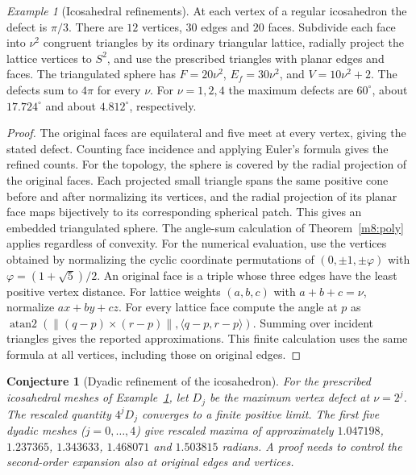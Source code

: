 \documentclass[11pt,reqno]{amsart}
\newtheorem{conjecture}[theorem]{Conjecture}
\theoremstyle{definition}
\theoremstyle{remark}
\newtheorem{example}[theorem]{Example}
\numberwithin{equation}{section}
\begin{document}
\begin{example}[Icosahedral refinements]\label{m8:icosa}
At each vertex of a regular icosahedron the defect is $\pi/3$.
There are $12$ vertices, $30$ edges and $20$ faces. Subdivide each face into $\nu^2$ congruent
triangles by its ordinary triangular lattice, radially project
the lattice vertices to $S^2$, and use the prescribed triangles
with planar edges and faces. The triangulated sphere has
$F=20\nu^2$, $E_f=30\nu^2$, and $V=10\nu^2+2$.
The defects sum to $4\pi$ for every $\nu$. For $\nu=1,2,4$
the maximum defects are $60^\circ$, about $17.724^\circ$ and
about $4.812^\circ$, respectively.
\end{example}
\begin{proof}
The original faces are equilateral and five meet at every vertex,
giving the stated defect. Counting face incidence and applying
Euler's formula gives the refined counts. For the topology, the
sphere is covered by the radial projection of the original
faces. Each projected small triangle spans the same positive cone
before and after normalizing its vertices, and the radial
projection of its planar face maps bijectively to its corresponding
spherical patch. This gives an embedded triangulated sphere.
The angle-sum calculation of Theorem~\ref{m8:poly} applies
regardless of convexity. For the numerical evaluation,
use the vertices obtained by normalizing the cyclic coordinate
permutations of $(0,\pm1,\pm\varphi)$ with
$\varphi=(1+\sqrt5)/2$. An original face is a triple whose three
edges have the least positive vertex distance. For lattice
weights $(a,b,c)$ with $a+b+c=\nu$, normalize $a x+b y+c z$.
For every lattice face compute the angle at $p$ as
$\operatorname{atan2}(\|(q-p)\times(r-p)\|,
\langle q-p,r-p\rangle)$. Summing over incident triangles gives
the reported approximations. This finite calculation uses the same
formula at all vertices, including those on original edges.
\end{proof}

\begin{conjecture}[Dyadic refinement of the icosahedron]\label{m8:conjecture}
For the prescribed icosahedral meshes of Example~\ref{m8:icosa},
let $D_j$ be the maximum vertex defect at $\nu=2^j$.
The rescaled quantity $4^jD_j$ converges to a finite positive
limit. The first five dyadic meshes ($j=0,\dots,4$) give rescaled maxima of approximately
$1.047198$, $1.237365$, $1.343633$, $1.468071$ and $1.503815$ radians.
A proof needs to control the second-order expansion also at
original edges and vertices.
\end{conjecture}
\end{document}
